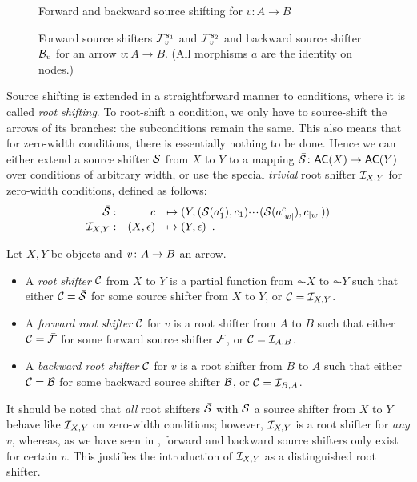 \begin{figure}[t]
\centering

\caption{Forward and backward source shifting for $v:A\to B$}
\end{figure}

\begin{figure}
\centering

\caption{Forward source shifters $\mathcal{F}_v^{s_1}$ and $\mathcal{F}_v^{s_2}$ and backward source shifter $\mathcal{B}_v$ for an arrow $v:A\to B$. (All morphisms $a$ are the identity on nodes.)}
\end{figure}

Source shifting is extended in a straightforward manner to conditions, where it is called \emph{root shifting}. To root-shift a condition, we only have to source-shift the arrows of its branches: the subconditions remain the same. This also means that for zero-width conditions, there is essentially nothing to be done. Hence we can either extend a source shifter $\mathcal{S}$ from $X$ to $Y$ to a mapping $\bar\cS\of \AC X\to \AC Y$ over conditions of arbitrary width, or use the special \emph{trivial} root shifter $\mathcal{I}_{X,Y}$ for zero-width conditions, defined as follows:
\[\begin{array}{rrl}
\bar{\mathcal{S}}: & c & \mapsto (Y,(\mathcal{S}(a^c_1),c_1){\cdotp\mkern-2mu\cdotp\mkern-2mu\cdotp\mkern1mu} (\mathcal{S}(a^c_{|w|}),c_{|w|})) \\
\mathcal{I}_{X,Y}: & (X,\epsilon) & \mapsto (Y,\epsilon) \enspace.
\end{array}\]

\begin{definition}
Let $X,Y$ be objects and $v\colon A\rightarrow B$ an arrow.
\begin{itemize}[topsep=\smallskipamount]
\item A \emph{root shifter} $\mathcal{C}$ from $X$ to $Y$ is a partial function from $\AC X$ to $\AC Y$ such that either $\mathcal{C}=\bar{\mathcal{S}}$ for some source shifter from $X$ to $Y$, or $\mathcal{C}=\mathcal{I}_{X,Y}$.

\item A \emph{forward root shifter} $\mathcal{C}$ for $v$ is a root shifter from $A$ to $B$ such that either $\mathcal{C}=\bar{\mathcal{F}}$ for some forward source shifter $\mathcal{F}$, or $\mathcal{C}=\mathcal{I}_{A,B}$.

\item A \emph{backward root shifter} $\mathcal{C}$ for $v$ is a root shifter from $B$ to $A$ such that either $\mathcal{C}=\bar{\mathcal{B}}$ for some backward source shifter $\mathcal{B}$, or $\mathcal{C}=\mathcal{I}_{B,A}$.
\end{itemize}
\end{definition}
%
It should be noted that \emph{all} root shifters $\bar{\mathcal{S}}$ with $\mathcal{S}$ a source shifter from $X$ to $Y$ behave like $\mathcal{I}_{X,Y}$ on zero-width conditions; however, $\mathcal{I}_{X,Y}$ is a root shifter for \emph{any} $v$, whereas, as we have seen in , forward and backward source shifters only exist for certain $v$. This justifies the introduction of $\mathcal{I}_{X,Y}$ as a  distinguished root shifter.

